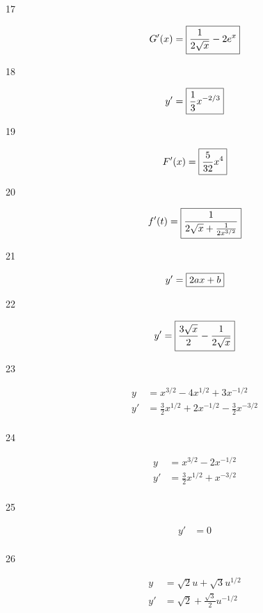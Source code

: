 \documentclass[letterpaper, landscape]{exam}
\begin{document}
\begin{description}
    \item[17] 
      \[
        G'(x) = \boxed{ \frac{1}{2 \sqrt{x}}-2 e^x } \\
      \]

    \item[18] 
      \[
        y' = \boxed{ \frac{1}{3} x^{-2/3} } \\
      \]

    \item[19] 
      \[
        F'(x) = \boxed{ \frac{5}{32} x^4 } \\
      \]

    \item[20] 
      \[
        f'(t) = \boxed{ \frac{1}{2 \sqrt{x} + \frac{1}{2 x^{3/2}} } } \\
      \]

    \item[21] 
      \[
        y' = \boxed{ 2ax + b } \\
      \]

    \item[22] 
      \[
        y' = \boxed{ \frac{3 \sqrt{x}}{2}-\frac{1}{2 \sqrt{x}} } \\
      \]

    \item[23] 
      \begin{align*}
        y  & = x^{3/2} - 4x^{1/2} + 3x^{-1/2} \\
        y' & = \boxed{ \frac{3}{2}x^{1/2} + 2x^{-1/2} - \frac{3}{2} x^{-3/2} } \\
      \end{align*}

    \item[24] 
      \begin{align*}
        y  & = x^{3/2} - 2x^{-1/2} \\
        y' & = \boxed{ \frac{3}{2}x^{1/2} + x^{-3/2} } \\
      \end{align*}

    \item[25] 
      \begin{align*}
        y' & = \boxed{ 0 } \\
      \end{align*}

    \item[26] 
      \begin{align*}
        y  & = \sqrt{2} u + \sqrt{3} u^{1/2} \\
        y' & = \boxed{\sqrt{2} + \frac{\sqrt{3}}{2} u^{-1/2}} \\
      \end{align*}


\end{description}
\end{document}
